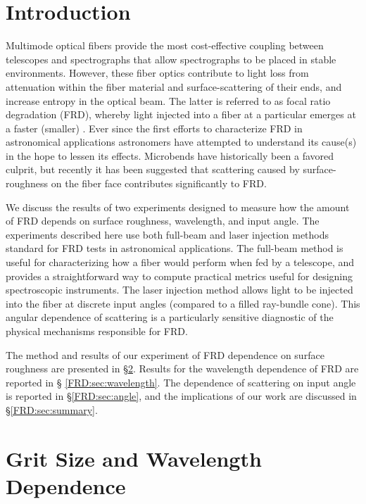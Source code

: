 \section{Introduction}

Multimode optical fibers provide the most cost-effective coupling between
telescopes and spectrographs that allow spectrographs to be placed in
stable environments. However, these fiber optics contribute to light
loss from attenuation within the fiber material and surface-scattering
of their ends, and increase entropy in the optical beam. The latter is
referred to as focal ratio degradation (FRD), whereby light injected
into a fiber at a particular \fratio emerges at a faster (smaller)
\fratio. Ever since the first efforts to characterize FRD in
astronomical applications\cite{Angel77} astronomers have attempted
to understand its cause(s) in the hope to lessen its
effects\cite{Carrasco,Oliveira}. Microbends have historically been a
favored culprit\cite{Carrasco,Gloge72}, but recently it has been
suggested\cite{Haynes11, Avila98} that scattering caused by
surface-roughness on the fiber face contributes significantly to
FRD.

We discuss the results of two experiments designed to measure how the
amount of FRD depends on surface roughness, wavelength, and input
angle. The experiments described here use both full-beam and laser
injection methods\cite{Carrasco} standard for FRD tests in
astronomical applications. The full-beam method is useful for
characterizing how a fiber would perform when fed by a telescope,
and provides a straightforward way to compute practical metrics useful
for designing spectroscopic instruments. The laser injection method
allows light to be injected into the fiber at discrete input angles
(compared to a filled ray-bundle cone). This angular dependence of
scattering is a particularly sensitive diagnostic of the physical
mechanisms responsible for FRD.

The method and results of our experiment of FRD dependence on surface
roughness are presented in \S \ref{FRD:sec:polish}. Results for the
wavelength dependence of FRD are reported in \S
\ref{FRD:sec:wavelength}. The dependence of scattering on input angle is
reported in \S \ref{FRD:sec:angle}, and the implications of our work are
discussed in \S \ref{FRD:sec:summary}.

\section{Grit Size and Wavelength Dependence}
\label{FRD:sec:polish}
